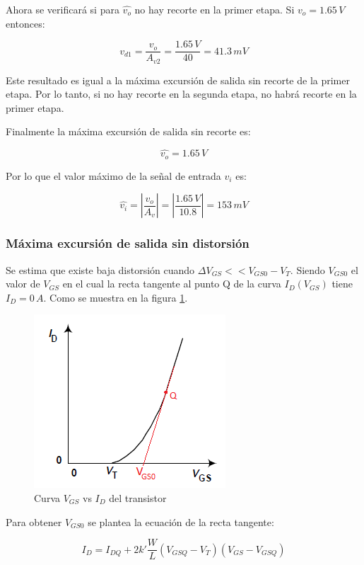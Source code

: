 \documentclass[10pt,spanish,a4paper,notitlepage]{article}
\begin{document}
Ahora se verificará si para $\widehat{v_{o}}$ no hay recorte en la primer etapa.
Si $v_o = 1.65\,\unit{V}$ entonces:

\[ \displaystyle v_{d1} = \frac{v_o}{A_{v2}} = \frac{1.65\,\unit{V}}{40} = 41.3 \,\unit{mV}\]

Este resultado es igual a la máxima excursión de salida sin recorte de la primer etapa. Por lo tanto, si no hay recorte en la segunda etapa, no habrá recorte en 
la primer etapa.

Finalmente la máxima excursión de salida sin recorte es:

\[ \displaystyle \widehat{v_o} = 1.65\,\unit{V} \]

Por lo que el valor máximo de la señal de entrada $v_i$ es:

\[ \displaystyle \widehat{v_i} = \left| \frac{v_o}{A_{v}} \right| = \left| \frac{1.65\,\unit{V}}{10.8} \right| = 153 \,\unit{mV} \]

\subsubsection{Máxima excursión de salida sin distorsión}

Se estima que existe baja distorsión cuando $\Delta V_{GS} << V_{GS0} - V_T$. Siendo $V_{GS0}$ el valor de $V_{GS}$ en el cual la recta
tangente al punto Q de la curva $I_D(V_{GS})$ tiene $I_D = 0\,\unit{A}$. Como se muestra en la figura \ref{fig:curva_distorsion}.

\begin{figure}[H]
\centering
\includegraphics[scale=0.8]{curvas/distorsion_curva.png}
\caption{Curva $V_{GS}$ vs $I_D$ del transistor}
\label{fig:curva_distorsion}
\end{figure}

Para obtener $V_{GS0}$ se plantea la ecuación de la recta tangente:

\[ \displaystyle I_D = I_{DQ} + 2k'\frac{W}{L} (V_{GSQ} - V_T) (V_{GS} - V_{GSQ}) \]
\end{document}
